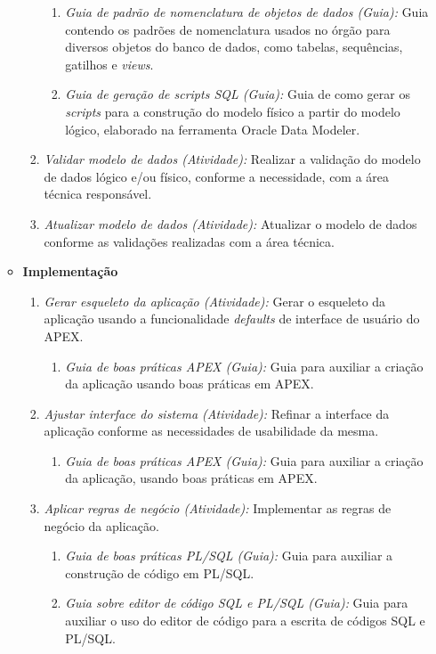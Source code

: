 \begin{itemize}
\begin{itemize}
\begin{enumerate}
\begin{enumerate}
\item \textit{Guia de padrão de nomenclatura de objetos de dados (Guia):} Guia contendo os padrões de nomenclatura usados no órgão para diversos objetos do banco de dados, como tabelas, sequências, gatilhos e \textit{views}.
\item \textit{Guia de geração de scripts SQL (Guia):} Guia de como gerar os \textit{scripts} para a construção do modelo físico a partir do modelo lógico, elaborado na ferramenta Oracle Data Modeler.
\end{enumerate}
\item \textit{Validar modelo de dados (Atividade):} Realizar a validação do modelo de dados lógico e/ou físico, conforme a necessidade, com a área técnica responsável.
\item \textit{Atualizar modelo de dados (Atividade):} Atualizar o modelo de dados conforme as validações realizadas com a área técnica.
\end{enumerate}
\item \textbf{Implementação}
\begin{enumerate}
\item \textit{Gerar esqueleto da aplicação (Atividade):} Gerar o esqueleto da aplicação usando a funcionalidade \textit{defaults} de interface de usuário do APEX.
\begin{enumerate}
\item \textit{Guia de boas práticas APEX (Guia):} Guia para auxiliar a criação da aplicação usando boas práticas em APEX.
\end{enumerate}
\item \textit{Ajustar interface do sistema (Atividade):} Refinar a interface da aplicação conforme as necessidades de usabilidade da mesma.
\begin{enumerate}
\item \textit{Guia de boas práticas APEX (Guia):} Guia para auxiliar a criação da aplicação, usando boas práticas em APEX.
\end{enumerate}
\item \textit{Aplicar regras de negócio (Atividade):} Implementar as regras de negócio da aplicação.
\begin{enumerate}
\item \textit{Guia de boas práticas PL/SQL (Guia):} Guia para auxiliar a construção de código em PL/SQL.
\item \textit{Guia sobre editor de código SQL e PL/SQL (Guia):} Guia para auxiliar o uso do editor de código para a escrita de códigos SQL e PL/SQL.

\end{enumerate}
\end{enumerate}
\end{itemize}
\end{itemize}
